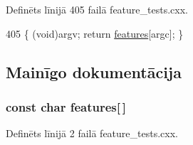 Definēts līnijā 405 failā feature\+\_\+tests.\+cxx.


\begin{DoxyCode}
405 \{ (void)argv; \textcolor{keywordflow}{return} \hyperlink{build_2_c_make_files_2feature__tests_8cxx_a1582568e32f689337602a16bf8a5bff0}{features}[argc]; \}
\end{DoxyCode}


\subsection{Mainīgo dokumentācija}
\subsubsection[{\texorpdfstring{features}{features}}]{\setlength{\rightskip}{0pt plus 5cm}const char features\mbox{[}$\,$\mbox{]}}\hypertarget{cmake-build-debug_2_c_make_files_2feature__tests_8cxx_a1582568e32f689337602a16bf8a5bff0}{}\label{cmake-build-debug_2_c_make_files_2feature__tests_8cxx_a1582568e32f689337602a16bf8a5bff0}


Definēts līnijā 2 failā feature\+\_\+tests.\+cxx.

